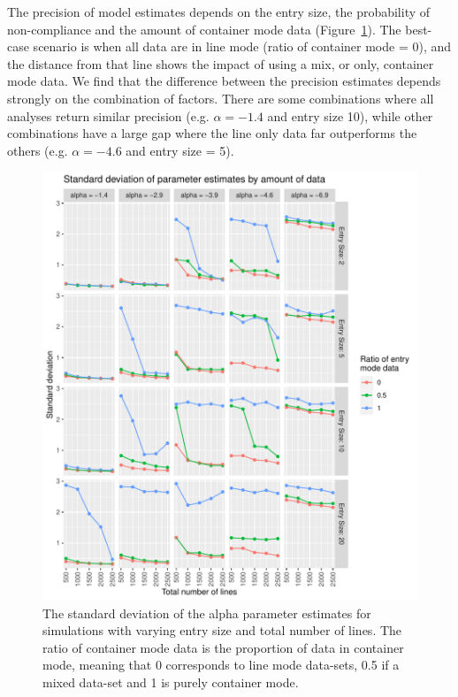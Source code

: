 \documentclass{article}
\begin{document}
The precision of model estimates depends on the entry size, the probability of non-compliance and the amount of container mode data (Figure~\ref{fig:SD_est_simulated}). The best-case scenario is when all data are in line mode (ratio of container mode = 0), and the distance from that line shows the impact of using a mix, or only, container mode data. We find that the difference between the precision estimates depends strongly on the combination of factors. There are some combinations where all analyses return similar precision (e.g. \(\alpha=-1.4\) and entry size 10), while other combinations have a large gap where the line only data far outperforms the others (e.g. \(\alpha=-4.6\) and entry size = 5).


\begin{figure}[h!]
\includegraphics[width=\textwidth]{../visualisations/figures/sim_study_pint_vs_data_vs_entry_size.pdf}
\caption{The standard deviation of the alpha parameter estimates for simulations with varying entry size and total number of lines. The ratio of container mode data is the proportion of data in container mode, meaning that 0 corresponds to line mode data-sets, 0.5 if a mixed data-set and 1 is purely container mode. }
\label{fig:SD_est_simulated}
\end{figure}
\end{document}
